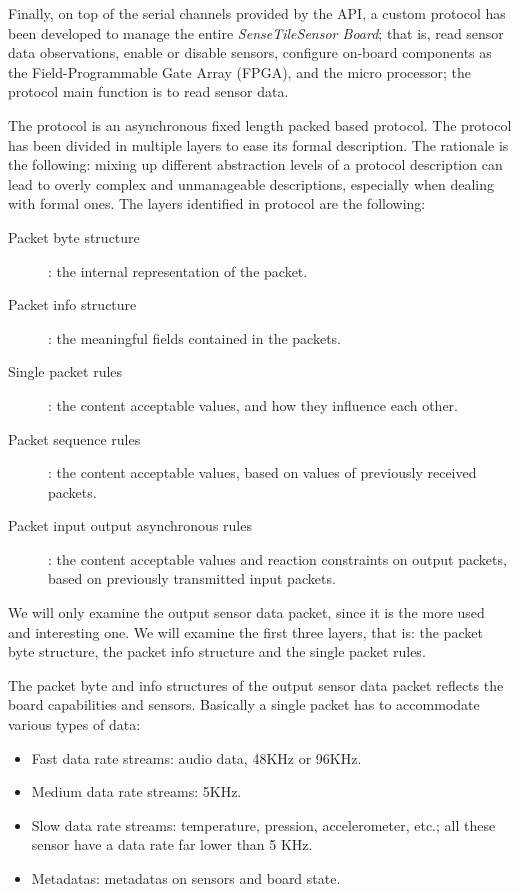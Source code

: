 \documentclass{article} \usepackage{times}
\newcommand{\ST}{\emph{SenseTile}\xspace}
\newcommand{\SB}{\emph{Sensor Board}\xspace}
\newcommand{\STSB}{\ST \SB\xspace}
\begin{document}
Finally, on top of the serial channels provided by the API, a custom protocol 
has been developed to manage the entire \STSB; that is, read sensor data 
observations, enable or disable sensors, configure on-board components 
as the Field-Programmable Gate Array (FPGA), and the micro processor; the 
protocol main function is to read sensor data.

The protocol is an asynchronous fixed length packed based protocol.
The protocol has been divided in multiple layers to ease its formal description.
The rationale is the following: mixing up different abstraction levels of a 
protocol description can lead to overly complex and unmanageable descriptions, 
especially when dealing with formal ones.
The layers identified in protocol are the following:

\begin{description}
 \item[Packet byte structure]: the internal representation of the packet.
 \item[Packet info structure]: the meaningful fields contained in the packets.
 \item[Single packet rules]: the content acceptable values, and how they 
influence each other.
 \item[Packet sequence rules]: the content acceptable values, based on values 
of previously received packets.
 \item[Packet input output asynchronous rules]: the content acceptable values 
and reaction constraints on output packets, based on previously transmitted 
input packets.
\end{description}

We will only examine the output sensor data packet, since it is the more used 
and interesting one.
We will examine the first three layers, that is: the packet byte structure, the 
packet info structure and the single packet rules.

The packet byte and info structures of the output sensor data packet reflects the board 
capabilities and sensors.
Basically a single packet has to accommodate various types of data:
\begin{itemize}
 \item Fast data rate streams: audio data, 48KHz or 96KHz.
 \item Medium data rate streams: 5KHz.
 \item Slow data rate streams: temperature, pression, accelerometer, etc.; all 
 these sensor have a data rate far lower than 5 KHz.
 \item Metadatas: metadatas on sensors and board state.
\end{itemize}
\end{document}
